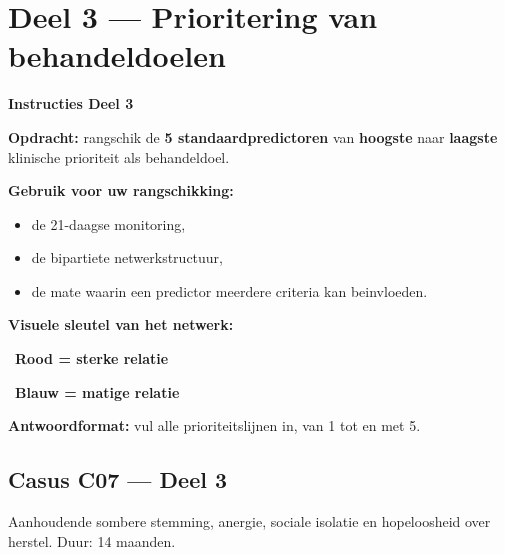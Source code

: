 \documentclass[11pt,a4paper]{article}
\begin{document}
\vspace{0.6em}
\newpage


\section{Deel 3 --- Prioritering van behandeldoelen}

\begin{tcolorbox}[colback=yellow!5,colframe=GoldAmber,arc=2.5mm,boxrule=0.9pt,
  left=10pt,right=10pt,top=9pt,bottom=9pt]
\textbf{\color{GoldAmber}Instructies Deel 3}

\smallskip\small
\textbf{Opdracht:} rangschik de \textbf{5 standaardpredictoren} van \textbf{hoogste} naar \textbf{laagste}
klinische prioriteit als behandeldoel.

\textbf{Gebruik voor uw rangschikking:}
\begin{itemize}[topsep=2pt,itemsep=1pt]
\item de 21-daagse monitoring,
\item de bipartiete netwerkstructuur,
\item de mate waarin een predictor meerdere criteria kan beinvloeden.
\end{itemize}

\textbf{Visuele sleutel van het netwerk:}
\begin{center}
~\textbf{Rood = sterke relatie}\qquad
{}~\textbf{Blauw = matige relatie}
\end{center}

\textbf{Antwoordformat:} vul alle prioriteitslijnen in, van 1 tot en met 5.
\end{tcolorbox}

\vspace{0.5em}
\subsection*{Casus C07 --- Deel 3}

\begin{complaintbox}[title={Casus C07 --- 46-jarige accountmanager}]
\small Aanhoudende sombere stemming, anergie, sociale isolatie en hopeloosheid over herstel. Duur: 14 maanden.
\end{complaintbox}
\end{document}
